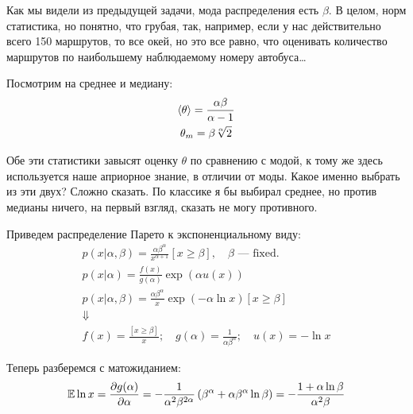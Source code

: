 \begin{solution}
    Как мы видели из предыдущей задачи, мода распределения есть $\beta$. В целом, норм статистика, но понятно, что грубая, так, например, если у нас действительно всего 150 маршрутов, то все окей, но это все равно, что оценивать количество маршрутов по наибольшему наблюдаемому номеру автобуса\ldots

    Посмотрим на среднее и медиану:
    \begin{gather}
        \braket{\theta} = \frac{\alpha \beta}{\alpha - 1} \\
        \theta_m = \beta \sqrt[\alpha]{2}
    \end{gather}

    Обе эти статистики завысят оценку $\theta$ по сравнению с модой, к тому же здесь используется наше априорное знание, в отличии от моды. Какое именно выбрать из эти двух? Сложно сказать. По классике я бы выбирал среднее, но против медианы ничего, на первый взгляд, сказать не могу противного.

    Приведем распределение Парето к экспоненциальному виду:
    \begin{gather}
        p(x|\alpha, \beta) = \frac{\alpha \beta^{\alpha}}{x^{\alpha + 1}}[x \ge \beta], \quad \beta \text{ --- fixed.} \\
        p(x | \alpha) = \frac{f(x)}{g(\alpha)}\exp(\alpha u(x)) \\
        p(x | \alpha, \beta) = \frac{\alpha \beta^{\alpha}}{x} \exp(-\alpha \ln x)[x \ge \beta] \\
        \Downarrow \\
        f(x) = \frac{[x \ge \beta]}{x}; \quad g(\alpha) = \frac{1}{\alpha \beta^{\alpha}}; \quad u(x) = -\ln x
    \end{gather}

    Теперь разберемся с матожиданием:
    \begin{gather}
        \mathbb{E} \ln x = \frac{\partial g(\alpha)}{\partial \alpha} = -\frac{1}{\alpha^2 \beta^{2 \alpha}}\left( \beta^{\alpha} + \alpha \beta^{\alpha} \ln \beta \right) = - \frac{1 + \alpha \ln \beta}{\alpha^2 \beta}
    \end{gather}

\end{solution}
